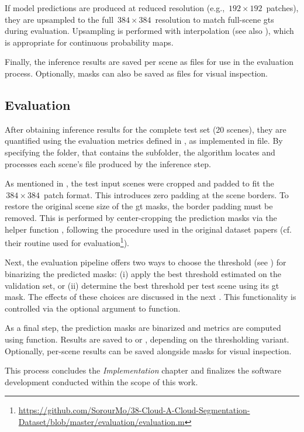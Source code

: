 {If model predictions are produced at reduced resolution (e.g., \(\,192\times192\,\) patches),
they are upsampled to the full \(\,384\times384\,\) resolution to match full-scene \glspl{gt} during evaluation.
Upsampling is performed with  interpolation (see also ),
which is appropriate for continuous probability maps.

Finally, the inference results are saved per scene as  files for use in the evaluation process.
Optionally, masks can also be saved as  files for visual inspection.

\subsection*{Evaluation}

After obtaining inference results for the complete test set (20 scenes), they are quantified using the evaluation metrics defined in ,
as implemented in  file.
By specifying the  folder, that contains the  subfolder,
the algorithm locates and processes each scene's  file produced by the inference step.

As mentioned in , the test input scenes were cropped and padded to fit the \(\,384\times384\,\) patch format.
This introduces zero padding at the scene borders. To restore the original scene size of the \gls{gt} masks, the border padding must be removed.
This is performed by center-cropping the prediction masks via the helper function ,
following the procedure used in the original dataset papers \cite{CloudNet2019, CloudDet2018} (cf. their  routine used
for evaluation\footnote{\url{https://github.com/SorourMo/38-Cloud-A-Cloud-Segmentation-Dataset/blob/master/evaluation/evaluation.m}}).

Next, the evaluation pipeline offers two ways to choose the threshold (see ) for binarizing the predicted masks:
(i) apply the best threshold estimated on the validation set, or
(ii) determine the best threshold per test scene using its \gls{gt} mask.
The effects of these choices are discussed in the next .
This functionality is controlled via the optional  argument to  function.

As a final step, the prediction masks are binarized and metrics are computed using  function.
Results are saved to  or , depending on the thresholding variant.
Optionally, per-scene  results can be saved alongside  masks for visual inspection.

This process concludes the \emph{Implementation} chapter and finalizes the software development conducted within the scope of this work.

}